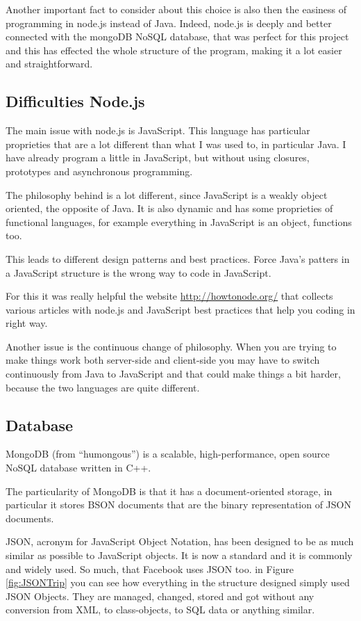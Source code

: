 Another important fact to consider about this choice is also then the easiness of programming in node.js instead of Java. Indeed, node.js is deeply and better connected with the mongoDB NoSQL database, that was perfect for this project and this has effected the whole structure of the program, making it a lot easier and straightforward.

\subsection{Difficulties Node.js}
The main issue with node.js is JavaScript. This language has particular proprieties that are a lot different than what I was used to, in particular Java. I have already program a little in JavaScript, but without using closures, prototypes and asynchronous programming.

The philosophy behind is a lot different, since JavaScript is a weakly object oriented, the opposite of Java. It is also dynamic and has some proprieties of functional languages, for example everything in JavaScript is an object, functions too.

This leads to different design patterns and best practices. Force Java's patters in a JavaScript structure is the wrong way to code in JavaScript.

For this it was really helpful the website \url{http://howtonode.org/} that collects various articles with node.js and JavaScript best practices that help you coding in right way.

Another issue is the continuous change of philosophy. When you are trying to make things work both server-side and client-side you may have to switch continuously from Java to JavaScript and that could make things a bit harder, because the two languages are quite different.

\subsection{Database}

MongoDB (from ``humongous'') is a scalable, high-performance, open source NoSQL database written in C++.

The particularity of MongoDB is that it has a document-oriented storage, in particular it stores BSON documents that are the binary representation of JSON documents.

JSON, acronym for JavaScript Object Notation, has been designed to be as much similar as possible to JavaScript objects. It is now a standard and it is commonly and widely used. So much, that Facebook uses JSON too. in Figure \ref{fig:JSONTrip} you can see how everything in the structure designed simply used JSON Objects. They are managed, changed, stored and got without any conversion from XML, to class-objects, to SQL data or anything similar.

